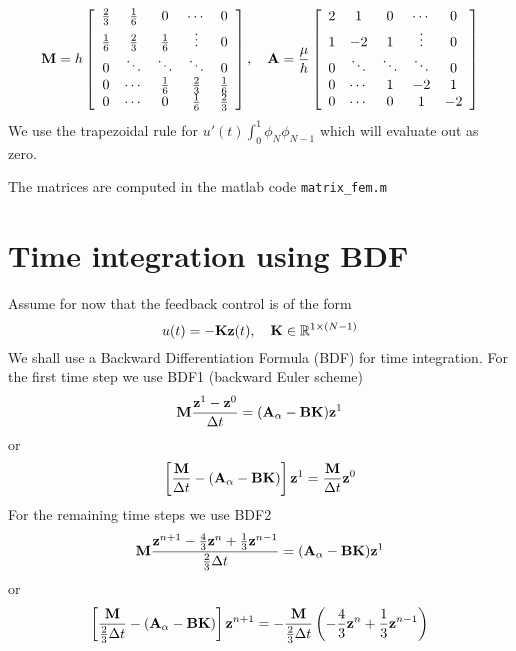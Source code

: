 \documentclass[12pt]{article}
\begin{document}
\[
 {\mathbf M} = h \left[\begin{array}{ccccc}
         \frac{2}{3} & \frac{1}{6} & 0 & \cdots & 0 \\
         \frac{1}{6} & \frac{2}{3} & \frac{1}{6}  & \vdots & 0 \\
         0 & \ddots  & \ddots & \ddots & 0 \\
         0 & \cdots & \frac{1}{6} & \frac{2}{3} & \frac{1}{6} \\
         0 & \cdots & 0 & \frac{1}{6} & \frac{2}{3}
        \end{array} \right] , \quad
 {\mathbf A} = \frac{\mu}{h} \left[\begin{array}{ccccc}
         \-2 & 1 & 0 & \cdots & 0 \\
         1 & -2 & 1  & \vdots & 0 \\
         0 & \ddots  & \ddots & \ddots & 0 \\
         0 & \cdots & 1 & -2 & 1 \\
         0 & \cdots & 0 & 1 & -2
        \end{array} \right]       
\]
We use the trapezoidal rule for $u'(t) \int_0^1 \phi_N \phi_{N-1}$ which will evaluate out as zero. 

\vspace{2mm}

\noindent
The matrices are computed in the matlab code {\tt matrix\_fem.m}
\section{Time integration using BDF}
Assume for now that the feedback control is of the form 
\[
 u(t) = - {\mathbf K} {\mathbf z}(t), \quad {\mathbf K} \in \mathbb{R}^{1\times(N-1)}
\]
We shall use a Backward Differentiation Formula (BDF) for time integration. For the first time step we use BDF1 (backward Euler scheme)
\[
 {\mathbf M} \frac{{\mathbf z}^1 - {\mathbf z}^0}{\Delta t} = ({\mathbf A}_\alpha - {\mathbf B} {\mathbf K}){\mathbf z}^1
\]
or
\[
 \left[ \frac{{\mathbf M} }{\Delta t} - ({\mathbf A}_\alpha - {\mathbf B} {\mathbf K}) \right] {\mathbf z}^1 =  \frac{{\mathbf M}}{\Delta t} {\mathbf z}^0 
\]
For the remaining time steps we use BDF2
\[
 {\mathbf M} \frac{{\mathbf z}^{n+1} - \frac{4}{3} {\mathbf z}^{n} + \frac{1}{3} {\mathbf z}^{n-1}}{\frac{2}{3}\Delta t} = ({\mathbf A}_\alpha - {\mathbf B} {\mathbf K}){\mathbf z}^1
\]
or
\[
 \left[ \frac{{\mathbf M} }{\frac{2}{3}\Delta t} - ({\mathbf A}_\alpha - {\mathbf B} {\mathbf K}) \right] {\mathbf z}^{n+1} =  -\frac{{\mathbf M}}{\frac{2}{3}\Delta t}\left( -\frac{4}{3} {\mathbf z}^{n} + \frac{1}{3} {\mathbf z}^{n-1} \right)
\]

\end{document}
